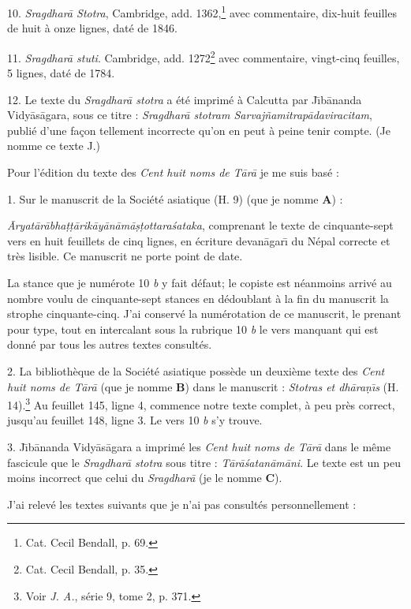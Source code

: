 \documentclass[a4paper, 11pt, oneside, french, landscape, twocolumn]{article}
\begin{document}
10. \emph{Sragdhar\={a} Stotra}, Cambridge, add. 1362,\footnote{Cat. Cecil Bendall, p. 69.} avec commentaire, dix-huit feuilles de huit à onze lignes, daté de 1846.

11. \emph{Sragdhar\={a} stuti}. Cambridge, add. 1272\footnote{Cat. Cecil Bendall, p. 35.} avec commentaire, vingt-cinq feuilles, 5 lignes, daté de 1784.

12. Le texte du \emph{Sragdhar\={a} stotra} a été imprimé à Calcutta par J\={\i}b\={a}nanda Vidy\={a}s\={a}gara, sous ce titre : \emph{Sragdhar\={a} stotram Sarvaj\~{n}amitrap\={a}daviracitam}, publié d'une façon tellement incorrecte qu'on en peut à peine tenir compte. (Je nomme ce texte J.)

\bigskip

Pour l'édition du texte des \emph{Cent huit noms de T\={a}r\={a}} je me suis basé :

1. Sur le manuscrit de la Société asiatique (H. 9) (que je nomme \textbf{A}) :

\emph{\={A}ryat\={a}r\={a}bha\d{t}\d{t}\={a}rik\={a}y\={a}n\={a}m\={a}\d{s}\d{t}ottara\'{s}ataka}, comprenant le texte de cinquante-sept vers en huit feuillets de cinq lignes, en écriture devan\={a}gar\={\i} du Népal correcte et très lisible. Ce manuscrit ne porte point de date.

La stance que je numérote 10 \emph{b} y fait défaut; le copiste est néanmoins arrivé au nombre voulu de cinquante-sept stances en dédoublant à la fin du manuscrit la strophe cinquante-cinq. J'ai conservé la numérotation de ce manuscrit, le prenant pour type, tout en intercalant sous la rubrique 10 \emph{b} le vers manquant qui est donné par tous les autres textes consultés.

2. La bibliothèque de la Société asiatique possède un deuxième texte des \emph{Cent huit noms de T\={a}r\={a}} (que je nomme \textbf{B}) dans le manuscrit : \emph{Stotras et dh\={a}ra\d{n}\={\i}s} (H. 14).\footnote{Voir \emph{J. A.}, série 9, tome 2, p. 371.} Au feuillet 145, ligne 4, commence notre texte complet, à peu près correct, jusqu'au feuillet 148, ligne 3. Le vers 10 \emph{b} s'y trouve.

3. J\={\i}b\={a}nanda Vidy\={a}s\={a}gara a imprimé les \emph{Cent huit noms de T\={a}r\={a}} dans le même fascicule que le \emph{Sragdhar\={a} stotra} sous titre : \emph{T\={a}r\={a}\'{s}atan\={a}m\={a}ni}. Le texte est un peu moins incorrect que celui du \emph{Sragdhar\={a}} (je le nomme \textbf{C}).

J'ai relevé les textes suivants que je n'ai pas consultés personnellement :
\end{document}
